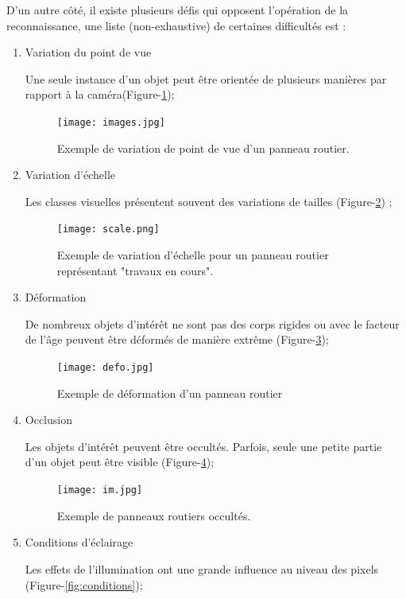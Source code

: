 D’un autre côté, il existe plusieurs défis qui opposent l’opération de la reconnaissance, une liste (non-exhaustive) de certaines difficultés est :
\begin{enumerate}
\item 
\begin{flushleft}
    
    Variation du point de vue\end{flushleft} Une seule instance d'un objet peut être orientée de plusieurs manières par rapport à la caméra(Figure-\ref{fig:variation});
    \begin{figure}[h]
      \centering
      \texttt{[image: images.jpg]}
    \caption{Exemple de variation de point de vue d'un panneau routier.}
    \label{fig:variation}
\end{figure}
 \pagebreak   
\item \begin{flushleft} Variation d'échelle\end{flushleft} Les classes visuelles présentent souvent des variations de tailles (Figure-\ref{fig:variation echel}) ;
 \begin{figure}[h!]
      \centering
      \texttt{[image: scale.png]}
    \caption{Exemple de variation d'échelle pour un panneau routier représentant "travaux en cours".}
    \label{fig:variation echel}
\end{figure}
\item \begin{flushleft} Déformation\end{flushleft} De nombreux objets d'intérêt ne sont pas des corps rigides ou avec le facteur de l’âge peuvent être déformés de manière extrême (Figure-\ref{fig:deform});
\begin{figure}[h!]
      \centering
      \texttt{[image: defo.jpg]}
    \caption{Exemple de déformation d'un panneau routier}
    \label{fig:deform}
\end{figure}
\item \begin{flushleft} Occlusion\end{flushleft} Les objets d'intérêt peuvent être occultés. Parfois, seule une petite partie d'un objet peut être visible (Figure-\ref{fig:occlusion});
\begin{figure}[h]
      \centering
      \texttt{[image: im.jpg]}
    \caption{Exemple de panneaux routiers occultés.}
    \label{fig:occlusion}
\end{figure}
\newpage
\item  \begin{flushleft} Conditions d'éclairage\end{flushleft}Les effets de l'illumination ont une grande influence au niveau des pixels (Figure-\ref{fig:conditions});

\end{enumerate}
